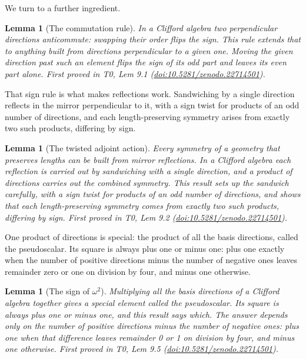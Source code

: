\documentclass[11pt]{article}
\newtheorem{lemma}[theorem]{Lemma}
\theoremstyle{definition}
\theoremstyle{plain}
\begin{document}
We turn to a further ingredient.

\begin{lemma}[The commutation rule]\label{c:primer.commutation-rule}
In a Clifford algebra two perpendicular directions anticommute: swapping their order flips the sign. This rule extends that to anything built from directions perpendicular to a given one. Moving the given direction past such an element flips the sign of its odd part and leaves its even part alone.
\emph{First proved in} T0, Lem 9.1 (\href{https://doi.org/10.5281/zenodo.22714501}{doi:10.5281/zenodo.22714501}).
\end{lemma}

That sign rule is what makes reflections work. Sandwiching by a single direction reflects in the mirror perpendicular to it, with a sign twist for products of an odd number of directions, and each length-preserving symmetry arises from exactly two such products, differing by sign.

\begin{lemma}[The twisted adjoint action]\label{c:primer.twisted-adjoint-action}
Every symmetry of a geometry that preserves lengths can be built from mirror reflections. In a Clifford algebra each reflection is carried out by sandwiching with a single direction, and a product of directions carries out the combined symmetry. This result sets up the sandwich carefully, with a sign twist for products of an odd number of directions, and shows that each length-preserving symmetry comes from exactly two such products, differing by sign.
\emph{First proved in} T0, Lem 9.2 (\href{https://doi.org/10.5281/zenodo.22714501}{doi:10.5281/zenodo.22714501}).
\end{lemma}

One product of directions is special: the product of all the basis directions, called the pseudoscalar. Its square is always plus one or minus one: plus one exactly when the number of positive directions minus the number of negative ones leaves remainder zero or one on division by four, and minus one otherwise.

\begin{lemma}[The sign of $\omega^2$]\label{c:primer.sign}
Multiplying all the basis directions of a Clifford algebra together gives a special element called the pseudoscalar. Its square is always plus one or minus one, and this result says which. The answer depends only on the number of positive directions minus the number of negative ones: plus one when that difference leaves remainder 0 or 1 on division by four, and minus one otherwise.
\emph{First proved in} T0, Lem 9.5 (\href{https://doi.org/10.5281/zenodo.22714501}{doi:10.5281/zenodo.22714501}).
\end{lemma}
\end{document}
